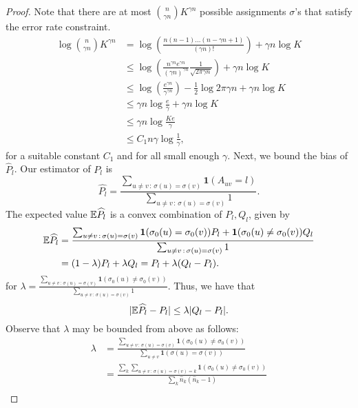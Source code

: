 \documentclass{article}
\begin{document}
\begin{proof}
Note that there are at most $\binom{n}{\gamma n} K^{\gamma n}$ possible assignments $\sigma$'s that satisfy the error rate constraint. 
\begin{align*}
\log \binom{n}{\gamma n} K^{\gamma n} & =
  \log \left( \frac{ n(n-1) ...(n-\gamma n+1) }{(\gamma n)!} \right) + \gamma n \log K \\
 & \leq \log \left( \frac{ n^{\gamma n} e^{\gamma n} }
     { (\gamma n)^{\gamma n} } \frac{1}{\sqrt{2\pi \gamma n}} \right) + \gamma n \log K \\
 & \leq \log \left( \frac{ e^{\gamma n} }{\gamma^{\gamma n}} \right) - \frac{1}{2} \log 2 \pi \gamma n + \gamma n \log K \\
 & \leq \gamma n \log \frac{e}{\gamma}  + \gamma n \log K \\
 & \leq  \gamma n \log \frac{Ke}{\gamma}\\
 &\leq C_1 n\gamma \log \frac{1}{\gamma},
\end{align*}
for a suitable constant $C_1$ and for all small enough $\gamma$.
Next, we bound the bias of $\hat{P}_l$.
Our estimator of $P_l$ is 
\[
\hat{P_l} = \frac{ \sum_{u \neq v \,:\, \sigma(u) = \sigma(v)} \mathbf{1}(A_{uv} = l) }{
                   \sum_{u \neq v \,:\, \sigma(u) = \sigma(v)} 1 }.
\]
The expected value ${\mathbb E} \widehat{P}_l$ is a convex combination of $P_l, Q_l$, given by
\begin{align}
{\mathbb E} \widehat{P_l} &= 
   \frac{ \sum_{u \neq v \,:\, \sigma(u) = \sigma(v)} 
             \mbox{\boldmath $1$}(\sigma_0(u) = \sigma_0(v) ) P_l + 
               \mbox{\boldmath $1$}(\sigma_0(u) \neq \sigma_0(v)) Q_l }{
                   \sum_{u \neq v \,:\, \sigma(u) = \sigma(v)} 1 } \nonumber \\
  &= (1 - \lambda) P_l + \lambda Q_l  = P_l + \lambda (Q_l - P_l). \label{eqn:bias_simple_bound}
\end{align}
for $\lambda = \frac{\sum_{u \neq v \,:\, \sigma(u) = \sigma(v)} 
     \mathbf{1}(\sigma_0(u) \neq \sigma_0(v)) }{\sum_{u \neq v \,:\, \sigma(u) = \sigma(v)} 1}$. Thus, we have that 
\[
|{\mathbb E} \widehat{P}_l - P_l | \leq \lambda |Q_l - P_l|.
\]
Observe that $\lambda$ may be bounded from above as follows:
\begin{align*}
\lambda 
  &= \frac{\sum_{u \neq v \,:\, \sigma(u) = \sigma(v) }\mathbf{1}(\sigma_0(u) \neq \sigma_0(v)) }{\sum_{u \neq v} \mathbf{1}(\sigma(u) = \sigma(v)) } 
      \\
  &= 
   \frac{\sum_k \sum_{u \neq v \,:\, \sigma(u)=\sigma(v)=k} \mathbf{1}(\sigma_0(u) \neq \sigma_0(v))}{\sum_k \hat{n}_k (\hat{n}_k-1)} 
      \\

\end{align*}
\end{proof}
\end{document}
